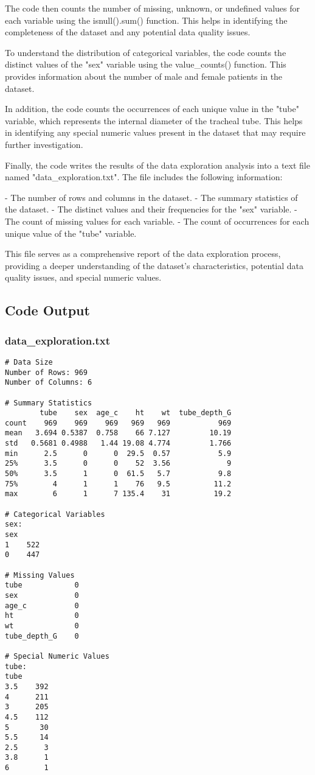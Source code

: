\documentclass[11pt]{article}
\begin{document}
The code then counts the number of missing, unknown, or undefined values for each variable using the isnull().sum() function. This helps in identifying the completeness of the dataset and any potential data quality issues.

To understand the distribution of categorical variables, the code counts the distinct values of the "sex" variable using the value\_counts() function. This provides information about the number of male and female patients in the dataset.

In addition, the code counts the occurrences of each unique value in the "tube" variable, which represents the internal diameter of the tracheal tube. This helps in identifying any special numeric values present in the dataset that may require further investigation.

Finally, the code writes the results of the data exploration analysis into a text file named "data\_exploration.txt". The file includes the following information:

- The number of rows and columns in the dataset.
- The summary statistics of the dataset.
- The distinct values and their frequencies for the "sex" variable.
- The count of missing values for each variable.
- The count of occurrences for each unique value of the "tube" variable.

This file serves as a comprehensive report of the data exploration process, providing a deeper understanding of the dataset's characteristics, potential data quality issues, and special numeric values.

\subsection{Code Output}

\subsubsection*{data\_exploration.txt}

\begin{Verbatim}[tabsize=4]
# Data Size
Number of Rows: 969
Number of Columns: 6

# Summary Statistics
        tube    sex  age_c    ht    wt  tube_depth_G
count    969    969    969   969   969           969
mean   3.694 0.5387  0.758    66 7.127         10.19
std   0.5681 0.4988   1.44 19.08 4.774         1.766
min      2.5      0      0  29.5  0.57           5.9
25%      3.5      0      0    52  3.56             9
50%      3.5      1      0  61.5   5.7           9.8
75%        4      1      1    76   9.5          11.2
max        6      1      7 135.4    31          19.2

# Categorical Variables
sex:
sex
1    522
0    447

# Missing Values
tube            0
sex             0
age_c           0
ht              0
wt              0
tube_depth_G    0

# Special Numeric Values
tube:
tube
3.5    392
4      211
3      205
4.5    112
5       30
5.5     14
2.5      3
3.8      1
6        1

\end{Verbatim}
\end{document}
